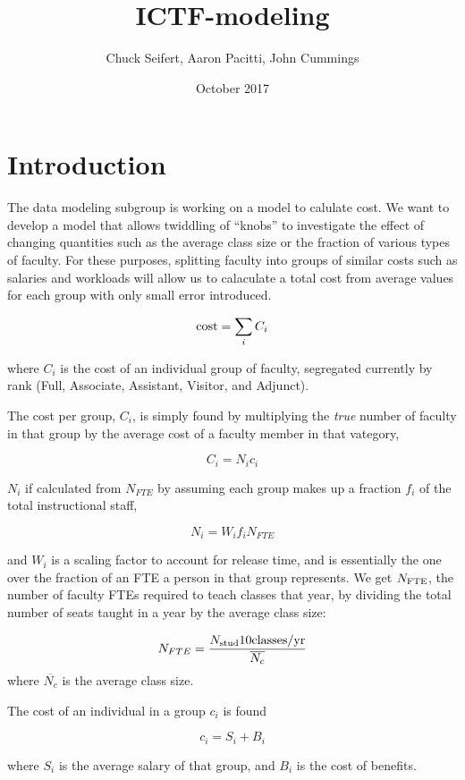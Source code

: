 \documentclass[12pt]{article}
\title{ICTF-modeling}
\author{Chuck Seifert, Aaron Pacitti, John Cummings}
\date{October 2017}
\begin{document}
\maketitle

\section{Introduction}

The data modeling subgroup is working on a model to calulate cost.  We want to develop a model that allows twiddling of ``knobs'' to investigate the effect of changing quantities such as the average class size or the fraction of various types of faculty. For these purposes, splitting faculty into groups of similar costs such as salaries and workloads will allow us to calaculate a total cost from average values for each group with only small error introduced.


\[
{\rm cost} =  \sum_i C_i
\]

where $C_i$ is the cost of an individual group of faculty, segregated currently by rank (Full, Associate, Assistant, Visitor, and Adjunct).

The cost per group, $C_i$, is simply found by multiplying the {\em true} number of faculty in that group by the average cost of a faculty member in that vategory,

\[
C_i = N_i c_i
\]

\vspace{1cm}
$N_i$ if calculated from $N_{FTE}$ by assuming each group makes up a fraction $f_i$ of the total instructional staff, 

\[
N_i = W_if_iN_{FTE}
\]

and $W_i$ is a scaling factor to account for release time, and is essentially the one over the fraction of an FTE a person in that group represents.  We get $N_{\rm FTE}$, the number of faculty FTEs required to teach classes that year, by dividing the total number of seats taught in a year by the average class size:

\[
N_{FTE} = \frac{N_{\rm stud}10 {\rm classes}/{\rm yr}}{\overline{N_c}}
\]
where $\overline{N_c}$ is the average class size.

\vspace{1cm}
The cost of an individual in a group $c_i$ is found

\[
c_i = S_i + B_i
\]

where $S_i$ is the average salary of that group, and $B_i$ is the cost of benefits.
\end{document}
